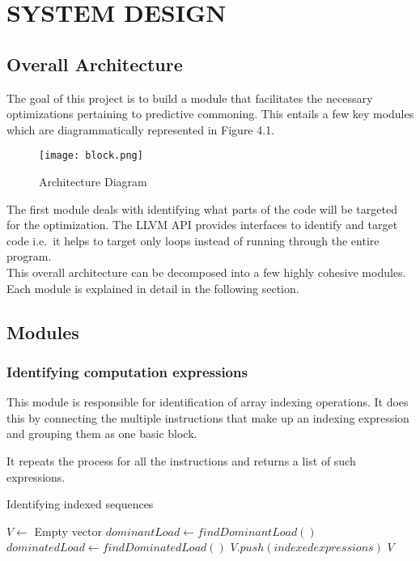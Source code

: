 \chapter{SYSTEM DESIGN} %

\section{Overall Architecture}
The goal of this project is to build a module that facilitates the necessary optimizations pertaining to predictive commoning. This entails a few key modules which are diagrammatically represented in Figure 4.1.
\newline

\begin{figure}[H]
	\centering
	\texttt{[image: block.png]}
	\caption{Architecture Diagram}
	\label{ArchDia}	
\end{figure}


The first module deals with identifying what parts of the code will be targeted for the optimization. The LLVM API provides interfaces to identify and target code i.e.\ it helps to target only loops instead of running through the entire program. \\ 

This overall architecture can be decomposed into a few highly cohesive modules. Each module is explained in detail in the following section.

\section{Modules}
\subsection{Identifying computation expressions}

This module is responsible for identification of array indexing operations. It does this by connecting the multiple instructions that make up an indexing expression and grouping them as one basic block.

It repeats the process for all the instructions and returns a list of such expressions.

\begin{algorithm}
	\caption{Identifying indexed sequences}
	\begin{algorithmic}
		\STATE $V \leftarrow$ Empty vector
		\STATE $dominantLoad \leftarrow findDominantLoad()$
		\STATE $dominatedLoad \leftarrow findDominatedLoad()$
		\STATE $V.push(indexed expressions)$
		\ENDIF
		\ENDFOR
		\RETURN $V$
	\end{algorithmic}
\end{algorithm}


